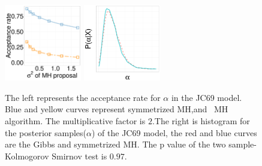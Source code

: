   \begin{figure}[H]
  \centering

  \begin{minipage}[!hp]{0.99\linewidth}
  	\centering
    \includegraphics [width=0.3\textwidth, angle=0]{figs/acc/JCalpha_k2.pdf}
	\hspace{.5in}
    \includegraphics [width=0.3\textwidth, angle=0]{figs/JC_ks/jc_hist_44_05_3_.pdf}
  \end{minipage}
    \caption{The left represents the acceptance rate for $\alpha$ in the JC69 model.  Blue and yellow curves represent symmetrized MH,and \naive\ MH  algorithm. The multiplicative factor is $2$.The right is histogram for the posterior samples($\alpha$) of the JC69 model, the red and blue curves are the Gibbs and symmetrized MH. The p value of the two sample-Kolmogorov Smirnov test is $ 0.97$.  }
     \label{fig:ACC_JC}
  \end{figure}
  
